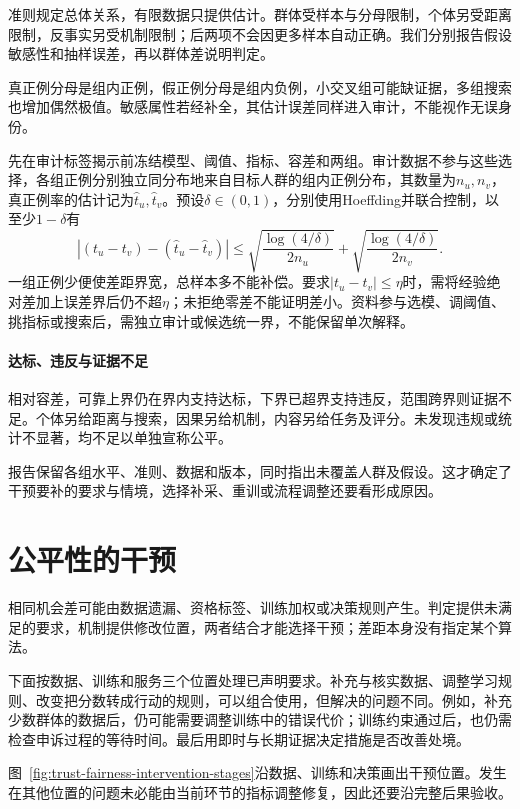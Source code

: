 准则规定总体关系，有限数据只提供估计。群体受样本与分母限制，个体另受距离限制，反事实另受机制限制；后两项不会因更多样本自动正确。我们分别报告假设敏感性和抽样误差，再以群体差说明判定。

真正例分母是组内正例，假正例分母是组内负例，小交叉组可能缺证据，多组搜索也增加偶然极值。敏感属性若经补全，其估计误差同样进入审计，不能视作无误身份。

先在审计标签揭示前冻结模型、阈值、指标、容差和两组。审计数据不参与这些选择，各组正例分别独立同分布地来自目标人群的组内正例分布，其数量为$n_u,n_v$，真正例率的估计记为$\hat t_u,\hat t_v$。预设$\delta\in(0,1)$，分别使用Hoeffding并联合控制，以至少$1-\delta$有
\[
 |(t_u-t_v)-(\hat t_u-\hat t_v)|
 \leq
 \sqrt{\frac{\log(4/\delta)}{2n_u}}
 +\sqrt{\frac{\log(4/\delta)}{2n_v}}.
\]
一组正例少便使差距界宽，总样本多不能补偿。要求$|t_u-t_v|\leq\eta$时，需将经验绝对差加上误差界后仍不超$\eta$；未拒绝零差不能证明差小。资料参与选模、调阈值、挑指标或搜索后，需独立审计或候选统一界，不能保留单次解释。

\paragraph{达标、违反与证据不足}

相对容差，可靠上界仍在界内支持达标，下界已超界支持违反，范围跨界则证据不足。个体另给距离与搜索，因果另给机制，内容另给任务及评分。未发现违规或统计不显著，均不足以单独宣称公平。

报告保留各组水平、准则、数据和版本，同时指出未覆盖人群及假设。这才确定了干预要补的要求与情境，选择补采、重训或流程调整还要看形成原因。

\section{公平性的干预}
\label{sec:fairness-intervention}

相同机会差可能由数据遗漏、资格标签、训练加权或决策规则产生。判定提供未满足的要求，机制提供修改位置，两者结合才能选择干预；差距本身没有指定某个算法。

下面按数据、训练和服务三个位置处理已声明要求。补充与核实数据、调整学习规则、改变把分数转成行动的规则，可以组合使用，但解决的问题不同。例如，补充少数群体的数据后，仍可能需要调整训练中的错误代价；训练约束通过后，也仍需检查申诉过程的等待时间。最后用即时与长期证据决定措施是否改善处境。

图~\ref{fig:trust-fairness-intervention-stages}沿数据、训练和决策画出干预位置。发生在其他位置的问题未必能由当前环节的指标调整修复，因此还要沿完整后果验收。

